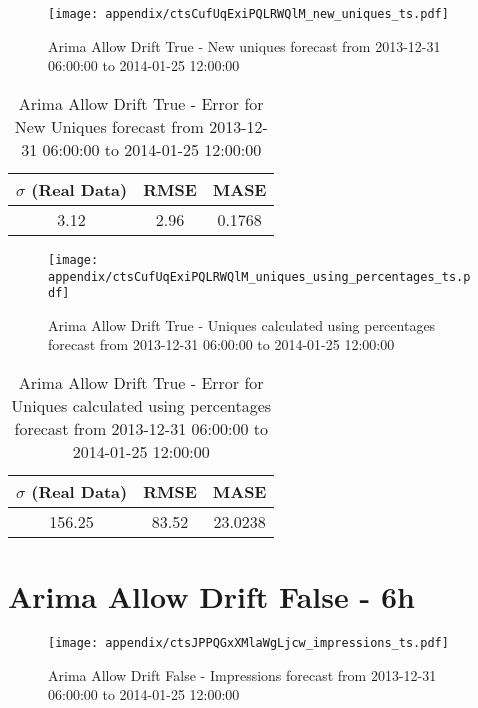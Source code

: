 \begin{figure}[H] \begin{center} \leavevmode
\texttt{[image: appendix/ctsCufUqExiPQLRWQlM\_new\_uniques\_ts.pdf]} \caption{
Arima Allow Drift True - New uniques forecast from 2013-12-31 06:00:00 to 2014-01-25 12:00:00} \label{fig:appendix/ctsCufUqExiPQLRWQlM_new_uniques_ts.pdf} \end{center}
\end{figure}

\begin{table}[H]
\centering
\footnotesize
\begin{tabular}{ccc}
$\sigma$ (Real Data) & RMSE & MASE   \\ \hline
3.12 & 2.96 & 0.1768 \\
\end{tabular}

\vspace{0.5cm}

\caption{
Arima Allow Drift True - Error for New Uniques forecast from 2013-12-31 06:00:00 to 2014-01-25 12:00:00}
\end{table}

\begin{figure}[H] \begin{center} \leavevmode
\texttt{[image: appendix/ctsCufUqExiPQLRWQlM\_uniques\_using\_percentages\_ts.pdf]} \caption{
Arima Allow Drift True - Uniques calculated using percentages forecast from 2013-12-31 06:00:00 to 2014-01-25 12:00:00} \label{fig:appendix/ctsCufUqExiPQLRWQlM_uniques_using_percentages_ts.pdf} \end{center}
\end{figure}

\begin{table}[H]
\centering
\footnotesize
\begin{tabular}{ccc}
$\sigma$ (Real Data) & RMSE & MASE   \\ \hline
156.25 & 83.52 & 23.0238 \\
\end{tabular}

\vspace{0.5cm}

\caption{
Arima Allow Drift True - Error for Uniques calculated using percentages forecast from 2013-12-31 06:00:00 to 2014-01-25 12:00:00}
\end{table}

\section{Arima Allow Drift False - 6h}
\begin{figure}[H] \begin{center} \leavevmode
\texttt{[image: appendix/ctsJPPQGxXMlaWgLjcw\_impressions\_ts.pdf]} \caption{
Arima Allow Drift False - Impressions forecast from 2013-12-31 06:00:00 to 2014-01-25 12:00:00} \label{fig:appendix/ctsJPPQGxXMlaWgLjcw_impressions_ts.pdf} \end{center}
\end{figure}

